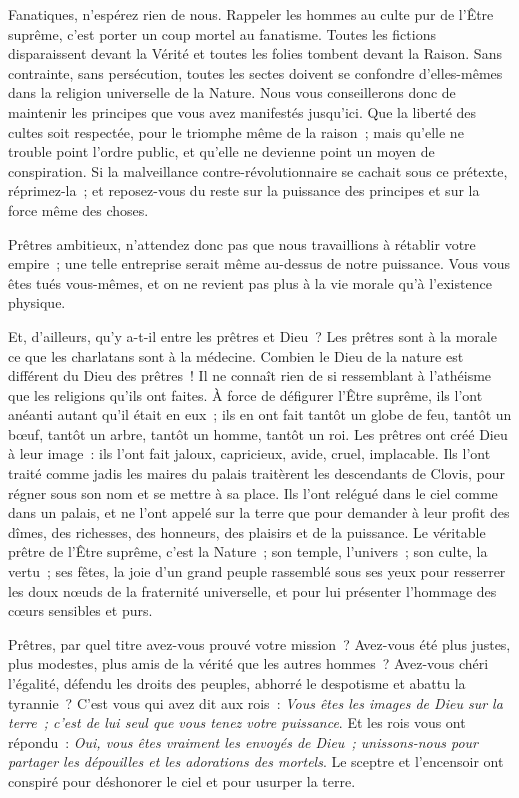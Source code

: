 \documentclass[french,twoside]{book} %
\begin{document}
Fanatiques, n’espérez rien de nous. Rappeler les hommes au culte pur de l’Être suprême, c’est porter un coup mortel au fanatisme. Toutes les fictions disparaissent devant la Vérité et toutes les folies tombent devant la Raison. Sans contrainte, sans persécution, toutes les sectes doivent se confondre d’elles-mêmes dans la religion universelle de la Nature. Nous vous conseillerons donc de maintenir les principes que vous avez manifestés jusqu’ici. Que la liberté des cultes soit respectée, pour le triomphe même de la raison ; mais qu’elle ne trouble point l’ordre public, et qu’elle ne devienne point un moyen de conspiration. Si la malveillance contre-révolutionnaire se cachait sous ce prétexte, réprimez-la ; et reposez-vous du reste sur la puissance des principes et sur la force même des choses.\par
Prêtres ambitieux, n’attendez donc pas que nous travaillions à rétablir votre empire ; une telle entreprise serait même au-dessus de notre puissance. Vous vous êtes tués vous-mêmes, et on ne revient pas plus à la vie morale qu’à l’existence physique.\par
Et, d’ailleurs, qu’y a-t-il entre les prêtres et Dieu ? Les prêtres sont à la morale ce que les charlatans sont à la médecine. Combien le Dieu de la nature est différent du Dieu des prêtres ! Il ne connaît rien de si ressemblant à l’athéisme que les religions qu’ils ont faites. À force de défigurer l’Être suprême, ils l’ont anéanti autant qu’il était en eux ; ils en ont fait tantôt un globe de feu, tantôt un bœuf, tantôt un arbre, tantôt un homme, tantôt un roi. Les prêtres ont créé Dieu à leur image : ils l’ont fait jaloux, capricieux, avide, cruel, implacable. Ils l’ont traité comme jadis les maires du palais traitèrent les descendants de Clovis, pour régner sous son nom et se mettre à sa place. Ils l’ont relégué dans le ciel comme dans un palais, et ne l’ont appelé sur la terre que pour demander à leur profit des dîmes, des richesses, des honneurs, des plaisirs et de la puissance. Le véritable prêtre de l’Être suprême, c’est la Nature ; son temple, l’univers ; son culte, la vertu ; ses fêtes, la joie d’un grand peuple rassemblé sous ses yeux pour resserrer les doux nœuds de la fraternité universelle, et pour lui présenter l’hommage des cœurs sensibles et purs.\par
Prêtres, par quel titre avez-vous prouvé votre mission ? Avez-vous été plus justes, plus modestes, plus amis de la vérité que les autres hommes ? Avez-vous chéri l’égalité, défendu les droits des peuples, abhorré le despotisme et abattu la tyrannie ? C’est vous qui avez dit aux rois : {\itshape Vous êtes les images de Dieu sur la terre ; c’est de lui seul que vous tenez votre puissance}. Et les rois vous ont répondu : {\itshape Oui, vous êtes vraiment les envoyés de Dieu ; unissons-nous pour partager les dépouilles et les adorations des mortels}. Le sceptre et l’encensoir ont conspiré pour déshonorer le ciel et pour usurper la terre.\par
\end{document}

